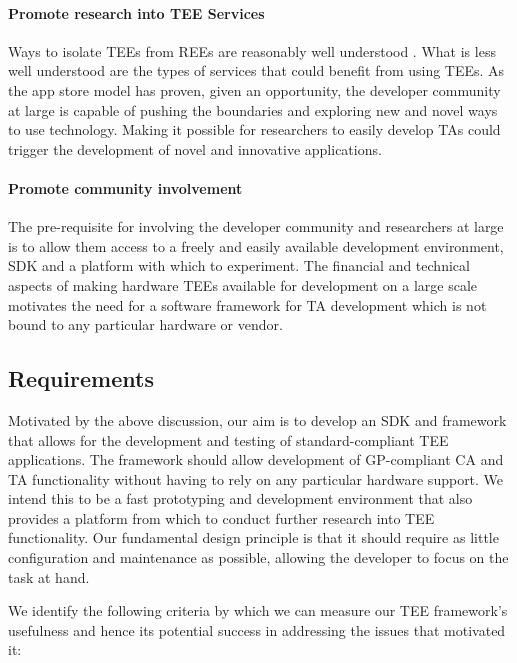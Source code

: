 \documentclass[10pt,conference,letterpaper]{IEEEtran}
\newif\ifnotabridged
\begin{document}
\paragraph{Promote research into TEE Services}
Ways to isolate TEEs from REEs are reasonably well understood \ifnotabridged{as we saw in Section~\ref{sec:background}}\fi. What is less well understood are the types of services that could benefit from using TEEs.  As the app store model has proven, given an opportunity, the developer community at large is capable of pushing the boundaries and exploring new and novel ways to use technology. Making it possible for researchers to easily develop TAs could trigger the development of novel and innovative applications.

\paragraph{Promote community involvement}
The pre-requisite for involving the developer community and researchers at large is to allow them access to a freely and easily available development environment, SDK and a platform with which to experiment.  The financial and technical aspects of making hardware TEEs available for development on a large scale motivates the need for a software framework for TA development which is not bound to any particular hardware or vendor.







\subsection{Requirements}
\label{subsec:requirements}
Motivated by the above discussion, our aim is to develop an SDK and framework that allows for the development and testing of standard-compliant TEE applications. The framework should allow development of GP-compliant CA and TA functionality without having to rely on any particular hardware support.  We intend this to be a fast prototyping and development environment that also provides a platform from which to conduct further research into TEE functionality.  Our fundamental design principle is that it should require as little configuration and maintenance as possible, allowing the developer to focus on the task at hand.

We identify the following criteria by which we can measure our TEE framework's usefulness and hence its potential success in addressing the issues that motivated it:
\end{document}
